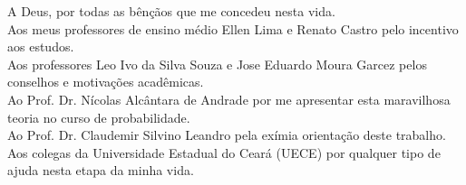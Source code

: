 A Deus, por todas as bênçãos que me concedeu nesta vida.\\
Aos meus professores de ensino médio Ellen Lima e Renato Castro pelo incentivo aos estudos.\\
Aos professores Leo Ivo da Silva Souza e Jose Eduardo Moura Garcez pelos conselhos e motivações acadêmicas.\\
Ao Prof. Dr. Nícolas Alcântara de Andrade por me apresentar esta maravilhosa teoria no curso de probabilidade. \\
Ao Prof. Dr. Claudemir Silvino Leandro pela exímia orientação deste trabalho.\\
Aos colegas da Universidade Estadual do Ceará (UECE) por qualquer tipo de ajuda nesta etapa da minha vida.\\



